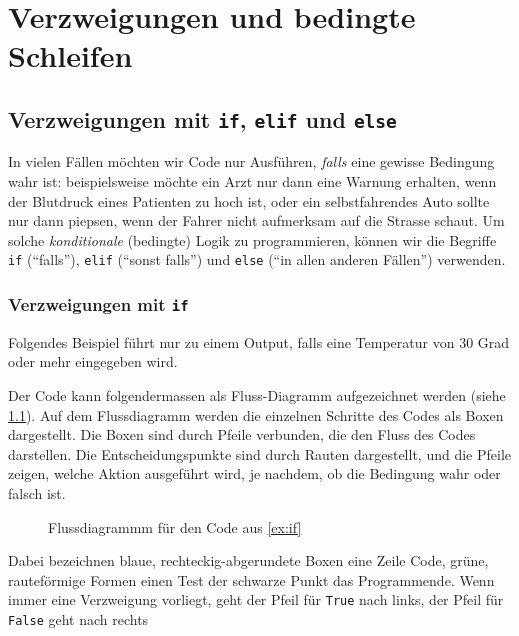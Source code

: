\chapter{Verzweigungen und bedingte Schleifen}\label{ch:K04_Logical_Expressions}

\section{Verzweigungen mit \texorpdfstring{\lstinline|if|}{if}, \texorpdfstring{\lstinline|elif|}{elif} und \texorpdfstring{\lstinline|else|}{else}}
In vielen Fällen möchten wir Code nur Ausführen, \textit{falls} eine gewisse Bedingung wahr ist: beispielsweise möchte ein Arzt nur dann eine Warnung erhalten, wenn der Blutdruck eines Patienten zu hoch ist, oder ein selbstfahrendes Auto sollte nur dann piepsen, wenn der Fahrer nicht aufmerksam auf die Strasse schaut. Um solche \textit{konditionale} (bedingte) Logik zu programmieren, können wir die Begriffe \lstinline|if| (\enquote{falls}), \lstinline|elif| (\enquote{sonst falls}) und \lstinline|else| (\enquote{in allen anderen Fällen}) verwenden.

\subsection{Verzweigungen mit \texorpdfstring{\lstinline|if|}{if}}

\begin{myexample}\label{ex:if}
Folgendes Beispiel führt nur zu einem Output, falls eine Temperatur von 30 Grad oder mehr eingegeben wird.


Der Code kann folgendermassen als Fluss-Diagramm aufgezeichnet werden (siehe \cref{fig:if-flussdiagramm}).
Auf dem Flussdiagramm werden die einzelnen Schritte des Codes als Boxen dargestellt. Die Boxen sind durch Pfeile verbunden, die den Fluss des Codes darstellen. Die Entscheidungspunkte sind durch Rauten dargestellt, und die Pfeile zeigen, welche Aktion ausgeführt wird, je nachdem, ob die Bedingung wahr oder falsch ist.

\begin{figure}[H]
	\centering
	
	\caption{Flussdiagrammm für den Code aus \cref{ex:if}}
	\label{fig:if-flussdiagramm}
\end{figure}
Dabei bezeichnen blaue, rechteckig-abgerundete Boxen eine Zeile Code, grüne, rauteförmige Formen einen Test der schwarze Punkt das Programmende. Wenn immer eine Verzweigung vorliegt, geht der Pfeil für \lstinline|True| nach links, der Pfeil für \lstinline|False| geht nach rechts
\end{myexample}

